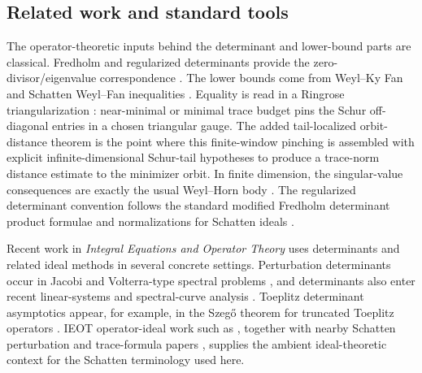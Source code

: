 \subsection{Related work and standard tools}

The operator-theoretic inputs behind the determinant and lower-bound parts are
classical.  Fredholm and regularized determinants provide the
zero-divisor/eigenvalue correspondence
\cite{Simon2005TraceIdeals,Simon1977InfiniteDeterminants,GohbergGoldbergKrupnik1996TracesDeterminants}.
The lower bounds come from Weyl--Ky Fan and Schatten Weyl--Fan inequalities
\cite{Weyl1949EigenvalueInequalities,Fan1951MaximumProperties,GohbergKrein1969NonSelfAdjoint,GohbergGoldbergKaashoek1990ClassesI,Bhatia1997MatrixAnalysis}.
Equality is read in a Ringrose triangularization
\cite{Ringrose1971CompactNonSelfAdjoint}:
near-minimal or minimal trace budget pins the Schur off-diagonal entries in a
chosen triangular gauge.  The added tail-localized orbit-distance theorem is
the point where this finite-window pinching is assembled with explicit
infinite-dimensional Schur-tail hypotheses to produce a trace-norm distance
estimate to the minimizer orbit.  In finite dimension, the singular-value
consequences are exactly the usual Weyl--Horn body
\cite{Horn1954DoublyStochastic}.  The regularized determinant convention
follows the standard modified Fredholm determinant product formulae and
normalizations for Schatten ideals
\cite{Simon2005TraceIdeals,GesztesyMakarov2004ModifiedFredholm,GesztesyLatushkinMitreaZinchenko2005,BritzCareyGesztesyNicholsSukochevZanin2021}.

Recent work in \emph{Integral Equations and Operator Theory} uses determinants
and related ideal methods in several concrete settings.  Perturbation
determinants occur in Jacobi and Volterra-type spectral problems
\cite{Golinskii2021}, and determinants also enter recent
linear-systems and spectral-curve analysis \cite{BlowerDoust2026}.  Toeplitz
determinant asymptotics appear, for example, in the Szeg\H{o} theorem for
truncated Toeplitz operators \cite{MiheisiOLoughlin2025}.  IEOT operator-ideal
work such as \cite{BrownFullerPittsReznikoff2024,JreisLefevre2024}, together
with nearby Schatten perturbation and trace-formula papers
\cite{VanNulandSkripka2023,ChattopadhyayCoineGiriPradhan2025}, supplies the
ambient ideal-theoretic context for the Schatten terminology used here.

